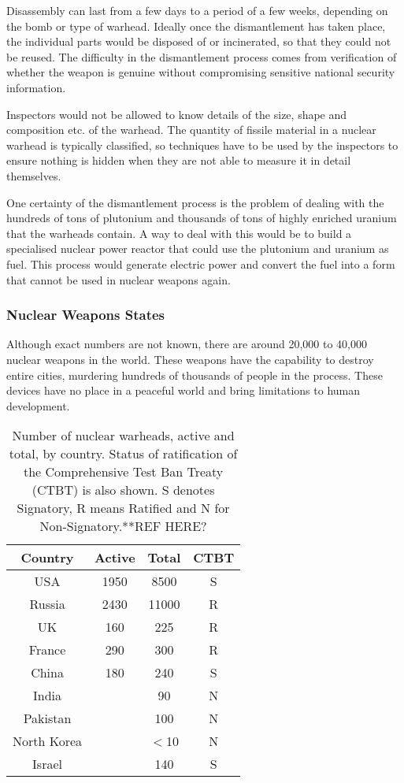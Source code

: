 \documentclass[twoside,titlepage,11pt,twocolumn,a4paper]{article}
\begin{document}
Disassembly can last from a few days to a period of a few weeks,
depending on the bomb or type of warhead. \citep{kopte1996} Ideally
once the dismantlement has taken place, the individual parts would be
disposed of or incinerated, so that they could not be reused. The
difficulty in the dismantlement process comes from verification of
whether the weapon is genuine without compromising sensitive national
security information.

Inspectors would not be allowed to know details of the size, shape and
composition etc. of the warhead. The quantity of fissile material in a
nuclear warhead is typically classified, so techniques have to be used
by the inspectors to ensure nothing is hidden when they are not able
to measure it in detail themselves.

One certainty of the dismantlement process is the problem of dealing
with the hundreds of tons of plutonium and thousands of tons of highly
enriched uranium that the warheads contain. A way to deal with this
would be to build a specialised nuclear power reactor that could use
the plutonium and uranium as fuel. This process would generate
electric power and convert the fuel into a form that cannot be used in
nuclear weapons again. \citep{moxFuel, feiveson2011, nature2009}

\subsubsection{Nuclear Weapons States}
Although exact numbers are not known, there are around 20,000 to
40,000 nuclear weapons in the world. \citep{worldNuclearForces2011,
  norris2010} These weapons have the capability to destroy entire
cities, murdering hundreds of thousands of people in the
process. These devices have no place in a peaceful world and bring
limitations to human development.

\begin{table}
  \begin{tabular}{|c|c|c|c|}
    \hline
    Country	& Active& Total		& CTBT	\\
    \hline
    USA		& 1950 	& 8500		& S	\\
    Russia	& 2430 	& 11000		& R	\\
    UK		& 160 	& 225		& R	\\
    France	& 290	& 300		& R	\\
    China	& 180	& 240		& S	\\
    India	&	& 90		& N	\\
    Pakistan	&	& 100		& N	\\
    North Korea	&	& \(<\)10	& N	\\
    Israel	&	& 140		& S	\\
    \hline
  \end{tabular}
  \caption{Number of nuclear warheads, active and total, by
    country. Status of ratification of the Comprehensive Test Ban
    Treaty (CTBT) is also shown. S denotes Signatory, R means Ratified
    and N for Non-Signatory.**REF HERE?}
  \label{tab:NWSwarheadsCTBT}
\end{table}
\end{document}
